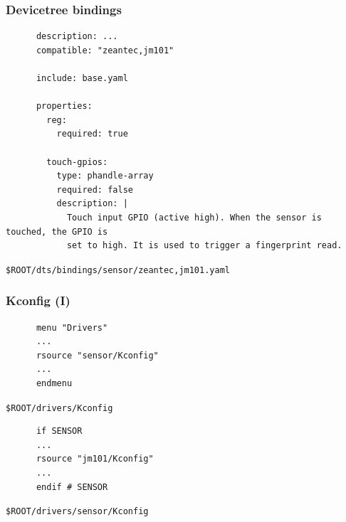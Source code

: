 \documentclass[handout]{beamer}
\begin{document}
\begin{frame}[fragile]
  \frametitle{Devicetree bindings}

  \begin{listing}[H]
    \begin{verbatim}
      description: ...
      compatible: "zeantec,jm101"

      include: base.yaml

      properties:
        reg:
          required: true

        touch-gpios:
          type: phandle-array
          required: false
          description: |
            Touch input GPIO (active high). When the sensor is touched, the GPIO is
            set to high. It is used to trigger a fingerprint read.

    \end{verbatim}
    \caption{\texttt{\$ROOT/dts/bindings/sensor/zeantec,jm101.yaml}}
  \end{listing}
\end{frame}

\begin{frame}[fragile]
  \frametitle{Kconfig (I)}

  \begin{listing}[H]
    \begin{verbatim}
      menu "Drivers"
      ...
      rsource "sensor/Kconfig"
      ...
      endmenu
    \end{verbatim}
    \caption{\texttt{\$ROOT/drivers/Kconfig}}
  \end{listing}

  \begin{listing}[H]
    \begin{verbatim}
      if SENSOR
      ...
      rsource "jm101/Kconfig"
      ...
      endif # SENSOR
    \end{verbatim}
    \caption{\texttt{\$ROOT/drivers/sensor/Kconfig}}
  \end{listing}
\end{frame}
\end{document}
